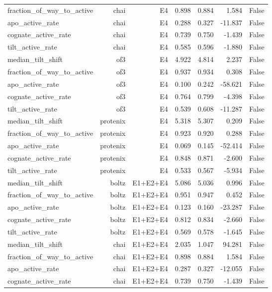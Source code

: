 \begin{longtable}{lrrrrrr}
fraction\_of\_way\_to\_active & chai & E4 & 0.898 & 0.884 & 1.584 & False \\
apo\_active\_rate & chai & E4 & 0.288 & 0.327 & -11.837 & False \\
cognate\_active\_rate & chai & E4 & 0.739 & 0.750 & -1.439 & False \\
tilt\_active\_rate & chai & E4 & 0.585 & 0.596 & -1.880 & False \\
median\_tilt\_shift & of3 & E4 & 4.922 & 4.814 & 2.237 & False \\
fraction\_of\_way\_to\_active & of3 & E4 & 0.937 & 0.934 & 0.308 & False \\
apo\_active\_rate & of3 & E4 & 0.100 & 0.242 & -58.621 & False \\
cognate\_active\_rate & of3 & E4 & 0.764 & 0.799 & -4.398 & False \\
tilt\_active\_rate & of3 & E4 & 0.539 & 0.608 & -11.287 & False \\
median\_tilt\_shift & protenix & E4 & 5.318 & 5.307 & 0.209 & False \\
fraction\_of\_way\_to\_active & protenix & E4 & 0.923 & 0.920 & 0.288 & False \\
apo\_active\_rate & protenix & E4 & 0.069 & 0.145 & -52.414 & False \\
cognate\_active\_rate & protenix & E4 & 0.848 & 0.871 & -2.600 & False \\
tilt\_active\_rate & protenix & E4 & 0.533 & 0.567 & -5.934 & False \\
median\_tilt\_shift & boltz & E1+E2+E4 & 5.086 & 5.036 & 0.996 & False \\
fraction\_of\_way\_to\_active & boltz & E1+E2+E4 & 0.951 & 0.947 & 0.452 & False \\
apo\_active\_rate & boltz & E1+E2+E4 & 0.123 & 0.160 & -23.287 & False \\
cognate\_active\_rate & boltz & E1+E2+E4 & 0.812 & 0.834 & -2.660 & False \\
tilt\_active\_rate & boltz & E1+E2+E4 & 0.569 & 0.578 & -1.645 & False \\
median\_tilt\_shift & chai & E1+E2+E4 & 2.035 & 1.047 & 94.281 & False \\
fraction\_of\_way\_to\_active & chai & E1+E2+E4 & 0.898 & 0.884 & 1.584 & False \\
apo\_active\_rate & chai & E1+E2+E4 & 0.287 & 0.327 & -12.055 & False \\
cognate\_active\_rate & chai & E1+E2+E4 & 0.739 & 0.750 & -1.439 & False \\

\end{longtable}

